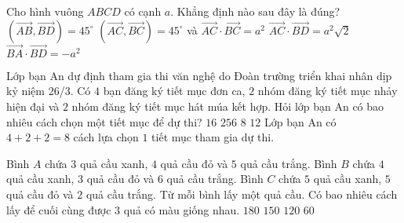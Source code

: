 \begin{ex}%
	Cho hình vuông $ABCD$ có cạnh $a$. Khẳng định nào sau đây là đúng?
	\choice
	{$(\overrightarrow{AB},\overrightarrow{BD})=45^\circ$}
	{\True $(\overrightarrow{AC},\overrightarrow{BC})=45^\circ$ và $\overrightarrow{AC}\cdot\overrightarrow{BC}=a^2$}
	{$\overrightarrow{AC}\cdot\overrightarrow{BD}=a^2\sqrt{2}$}
	{$\overrightarrow{BA}\cdot\overrightarrow{BD}=-a^2$}
\end{ex}

\begin{ex}%
	Lớp bạn An dự định tham gia thi văn nghệ do Đoàn trường triển khai nhân dịp kỷ niệm 26/3. Có $4$ bạn đăng ký tiết mục đơn ca, $2$ nhóm đăng ký tiết mục nhảy hiện đại và $2$ nhóm đăng ký tiết mục hát múa kết hợp. Hỏi lớp bạn An có bao nhiêu cách chọn một tiết mục để dự thi?
	\choice
	{$16$}
	{$256$}
	{\True $8$}
	{$12$}
	\loigiai
	{Lớp bạn An có $4+2+2=8$ cách lựa chọn $1$ tiết mục tham gia dự thi.}
\end{ex}

\begin{ex}%
	Bình $A$ chứa $3$ quả cầu xanh, $4$ quả cầu đỏ và $5$ quả cầu trắng. Bình $B$ chứa $4$ quả cầu xanh, $3$ quả cầu đỏ và $6$ quả cầu trắng. Bình $C$ chứa $5$ quả cầu xanh, $5$ quả cầu đỏ và $2$ quả cầu trắng. Từ mỗi bình lấy một quả cầu. Có bao nhiêu cách lấy để cuối cùng được $3$ quả có màu giống nhau.
	\choice
	{\True $180$}
	{$150$}
	{$120$}
	{$60$}
\end{ex}

